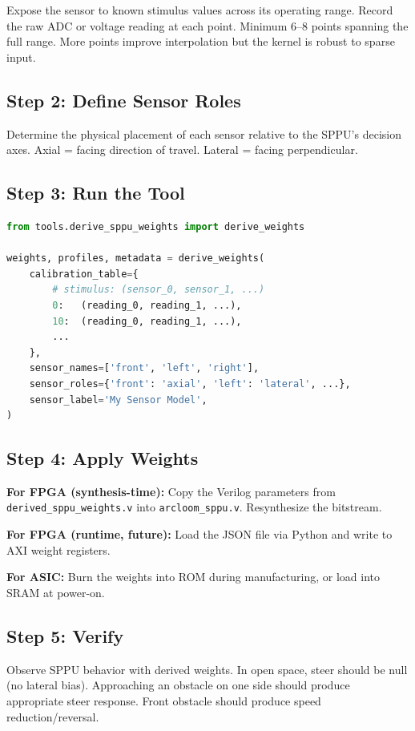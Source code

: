 \documentclass[11pt,a4paper]{article}
\begin{document}
Expose the sensor to known stimulus values across its operating
range. Record the raw ADC or voltage reading at each point. Minimum
6--8 points spanning the full range. More points improve interpolation
but the kernel is robust to sparse input.

\subsection{Step 2: Define Sensor Roles}

Determine the physical placement of each sensor relative to the
SPPU's decision axes. Axial = facing direction of travel.
Lateral = facing perpendicular.

\subsection{Step 3: Run the Tool}

\begin{lstlisting}[language=Python]
from tools.derive_sppu_weights import derive_weights

weights, profiles, metadata = derive_weights(
    calibration_table={
        # stimulus: (sensor_0, sensor_1, ...)
        0:   (reading_0, reading_1, ...),
        10:  (reading_0, reading_1, ...),
        ...
    },
    sensor_names=['front', 'left', 'right'],
    sensor_roles={'front': 'axial', 'left': 'lateral', ...},
    sensor_label='My Sensor Model',
)
\end{lstlisting}

\subsection{Step 4: Apply Weights}

\textbf{For FPGA (synthesis-time):} Copy the Verilog parameters from
\texttt{derived\_sppu\_weights.v} into \texttt{arcloom\_sppu.v}.
Resynthesize the bitstream.

\textbf{For FPGA (runtime, future):} Load the JSON file via Python
and write to AXI weight registers.

\textbf{For ASIC:} Burn the weights into ROM during manufacturing,
or load into SRAM at power-on.

\subsection{Step 5: Verify}

Observe SPPU behavior with derived weights. In open space, steer
should be null (no lateral bias). Approaching an obstacle on one
side should produce appropriate steer response. Front obstacle
should produce speed reduction/reversal.
\end{document}
